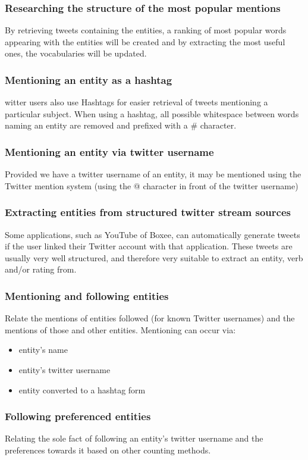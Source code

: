 \documentclass{article}
\begin{document}
\subsubsection{Researching the structure of the most popular mentions}
By retrieving tweets containing the entities, a ranking of most popular words
appearing with the entities will be created and by extracting the most useful
ones, the vocabularies will be updated.
\subsubsection{Mentioning an entity as a hashtag}
witter users also use Hashtags for easier retrieval of tweets mentioning
a particular subject. When using a hashtag, all possible whitespace between
words naming an entity are removed and prefixed with a \# character.
\subsubsection{Mentioning an entity via twitter username}
Provided we have a twitter username of an entity, it may be mentioned using 
the Twitter mention system (using the @ character in front of the twitter
 username)
\subsubsection{Extracting entities from structured twitter stream sources}
Some applications, such as YouTube of Boxee, can automatically generate tweets 
if the user linked their Twitter account with that application. These tweets are 
usually very well structured, and therefore very suitable to extract an entity, verb and/or rating from.
\subsubsection{Mentioning and following entities}
Relate the mentions of entities followed (for known Twitter usernames) and the mentions of those and other entities. Mentioning can occur via:
\begin{itemize}
\item entity's name
\item entity's twitter username
\item entity converted to a hashtag form
\end{itemize}
\subsubsection{Following preferenced entities}
Relating the sole fact of following an entity's twitter username and the preferences towards it based on other counting methods.
\end{document}
